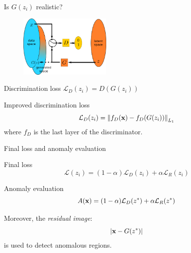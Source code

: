 \documentclass[xcolor=pdftex,dvipsnames,table,mathserif]{beamer}
\begin{document}
\begin{frame}{Is $G(z_i)$ realistic?}

  \begin{figure}[ht]
    \centering
    \includegraphics[width=0.4\textwidth]{gan2}
  \end{figure}

  \begin{block}{Discrimination loss}
    \centering
    $\mathcal{L}_D(z_i) = D(G(z_i))$
  \end{block}

  \begin{block}{Improved discrimination loss}
    \[\mathcal{L}_D(z_i) = \norm{f_D(\mathbf{x}) - f_D(G(z_i))}_{L_1}\]
    where $f_D$ is the last layer of the discriminator.
  \end{block}


\end{frame}


\begin{frame}{Final loss and anomaly evaluation}

  \begin{block}{Final loss}
    \[\mathcal{L}(z_i) = (1-\alpha)\mathcal{L}_D(z_i) + \alpha \mathcal{L}_R(z_i) \]
  \end{block}

  \begin{block}{Anomaly evaluation}
    \[A(\mathbf{x}) = (1-\alpha)\mathcal{L}_D(z^*) + \alpha \mathcal{L}_R(z^*) \]

      Moreover, the \emph{residual image}:
      \[
      |\mathbf{x} - G(z^*)|
      \]
      is used to detect anomalous regions.
  \end{block}

\end{frame}
\end{document}
